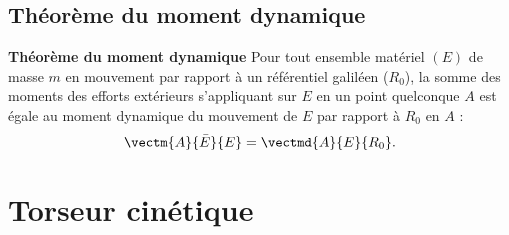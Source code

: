 
\subsection{Théorème du moment dynamique}
\begin{theorem}\textbf{Théorème du moment dynamique}
			Pour tout ensemble matériel $(E)$ de masse $m$ en mouvement par rapport à un référentiel galiléen ($R_0$), la somme des moments des efforts extérieurs s'appliquant sur $E$ en un point quelconque $A$ est égale au moment dynamique du mouvement de $E$ par rapport à $R_0$ en $A$ :
			$$
				\vectm{A}{\bar E}{E}=\vectmd{A}{E}{R_0}.
			$$
		\end{theorem}

%
%
%

\section{Torseur cinétique }

